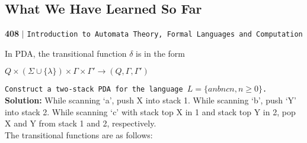 \documentclass[9pt]{beamer}
\begin{document}
\begin{frame}
\section*{What We Have Learned So Far}
\begin{flushleft}
    \textbf{408}\hspace*{0.1cm} \textbf{$|$} \hspace*{0.1cm} \texttt{Introduction to Automata Theory, Formal Languages and Computation}
  \end{flushleft}

\vspace*{0.5cm}
In PDA, the transitional function $\delta$ is in the form\\

\begin{center}
  $Q \times (\Sigma \cup \{\lambda\}) \times \Gamma \times \Gamma ' \rightarrow (Q, \Gamma, \Gamma ')$ \\
\end{center}

\hspace*{0.1cm} \texttt{\small{Construct a two-stack PDA for the language $L = \{anbncn, n \geq 0\}$.}}\\

\textbf{Solution:} While scanning ‘a’, push X into stack 1. While scanning ‘b’, push ‘Y’ into stack 2. While
scanning ‘c’ with stack top X in 1 and stack top Y in 2, pop X and Y from stack 1 and 2, respectively.\\
The transitional functions are as follows:\\
\end{frame}
\end{document}
